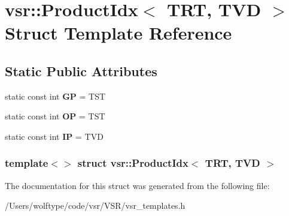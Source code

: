 \hypertarget{structvsr_1_1_product_idx_3_01_t_r_t_00_01_t_v_d_01_4}{\section{vsr\-:\-:Product\-Idx$<$ T\-R\-T, T\-V\-D $>$ Struct Template Reference}
\label{structvsr_1_1_product_idx_3_01_t_r_t_00_01_t_v_d_01_4}
}
\subsection*{Static Public Attributes}
\begin{DoxyCompactItemize}
\item 
\hypertarget{structvsr_1_1_product_idx_3_01_t_r_t_00_01_t_v_d_01_4_a549fb1ac9cac2ed90583e8b32fb2f610}{static const int {\bfseries G\-P} = T\-S\-T}\label{structvsr_1_1_product_idx_3_01_t_r_t_00_01_t_v_d_01_4_a549fb1ac9cac2ed90583e8b32fb2f610}

\item 
\hypertarget{structvsr_1_1_product_idx_3_01_t_r_t_00_01_t_v_d_01_4_adc79754cd21e8585ca671c56cabda7e7}{static const int {\bfseries O\-P} = T\-S\-T}\label{structvsr_1_1_product_idx_3_01_t_r_t_00_01_t_v_d_01_4_adc79754cd21e8585ca671c56cabda7e7}

\item 
\hypertarget{structvsr_1_1_product_idx_3_01_t_r_t_00_01_t_v_d_01_4_a06efcca81094740e052cbe916c3e09e2}{static const int {\bfseries I\-P} = T\-V\-D}\label{structvsr_1_1_product_idx_3_01_t_r_t_00_01_t_v_d_01_4_a06efcca81094740e052cbe916c3e09e2}

\end{DoxyCompactItemize}
\subsubsection*{template$<$$>$ struct vsr\-::\-Product\-Idx$<$ T\-R\-T, T\-V\-D $>$}



The documentation for this struct was generated from the following file\-:\begin{DoxyCompactItemize}
\item 
/\-Users/wolftype/code/vsr/\-V\-S\-R/vsr\-\_\-templates.\-h\end{DoxyCompactItemize}
